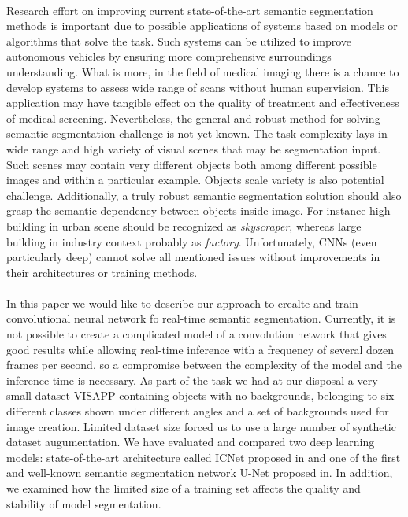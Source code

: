 \documentclass{article}
\begin{document}
\paragraph{}
Research effort on improving current state-of-the-art semantic segmentation methods is important due to possible applications of systems based on models or algorithms that solve the task. Such systems can be utilized to improve autonomous vehicles by ensuring more comprehensive surroundings understanding. What is more, in the field of medical imaging there is a chance to develop systems to assess wide range of scans without human supervision. This application may have tangible effect on the quality of treatment and effectiveness of medical screening. Nevertheless, the general and robust method for solving semantic segmentation challenge is not yet known. The task complexity lays in wide range and high variety of visual scenes that may be segmentation input. Such scenes may contain very different objects both among different possible images and within a particular example. Objects scale variety is also potential challenge. Additionally, a truly robust semantic segmentation solution should also grasp the semantic dependency between objects inside image. For instance high building in urban scene should be recognized as \textit{skyscraper}, whereas large building in industry context probably as \textit{factory}. Unfortunately, CNNs (even particularly deep) cannot solve all mentioned issues without improvements in their architectures or training methods. 

\paragraph{}
In this paper we would like to describe our approach to crealte and train convolutional neural network fo real-time semantic segmentation. Currently, it is not possible to create a complicated model of a convolution network that gives good results while allowing real-time inference with a frequency of several dozen frames per second, so a compromise between the complexity of the model and the inference time is necessary. As part of the task we had at our disposal a very small dataset VISAPP \cite{visapp} containing objects with no backgrounds, belonging to six different classes shown under different angles and a set of backgrounds used for image creation. Limited dataset size forced us to use a large number of synthetic dataset augumentation. We have evaluated and compared two deep learning models: state-of-the-art architecture called  ICNet proposed in \cite{icnet} and one of the first and well-known semantic segmentation network U-Net proposed in\cite{unet}. In addition, we examined how the limited size of a training set affects the quality and stability of model segmentation.
\end{document}
